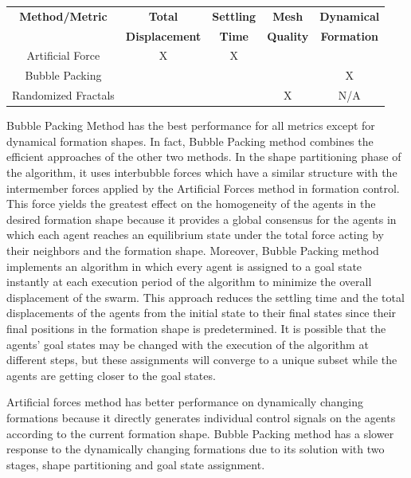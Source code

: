 \begin{center}
 \label{worst_performance} 
\begin{tabular}{||c| c| c | c | c||}
				
\hline
\textbf{Method/Metric} & \textbf{Total}  & \textbf{Settling} & \textbf{Mesh} & \textbf{Dynamical}\\ 
                       & \textbf{Displacement}  & \textbf{Time} & \textbf{Quality} & \textbf{Formation}\\
\hline
Artificial Force & X & X & & \\
Bubble Packing & &  & & X\\	
Randomized Fractals & &  & X & N/A \\	
\hline
\end{tabular}
\end{center}
		
Bubble Packing Method has the best performance for all metrics except for dynamical formation shapes. In fact, Bubble Packing method combines the efficient approaches of the other two methods. In the shape partitioning phase of the algorithm, it uses interbubble forces which have a similar structure with the intermember forces applied by the Artificial Forces method in formation control. This force yields the greatest  effect on the homogeneity of the agents in the desired formation shape because it provides a global consensus for the agents in which each agent reaches an equilibrium state under the total force acting by their neighbors and the formation shape. Moreover, Bubble Packing method implements an algorithm in which every agent is assigned to a goal state instantly at each execution period of the algorithm to minimize the overall displacement of the swarm. This approach reduces the settling time and the total displacements of the agents from the initial state to their final states since their final positions in the formation shape is predetermined. It is possible that the agents' goal states may be changed with the execution of the algorithm at different steps, but these assignments will converge to a unique subset while the agents are getting closer to the goal states. 

Artificial forces method has better performance on dynamically changing formations because it directly generates individual control signals on the agents according to the current formation shape. Bubble Packing method has a slower response to the dynamically changing formations due to its solution with two stages, shape partitioning and goal state assignment. 
		
